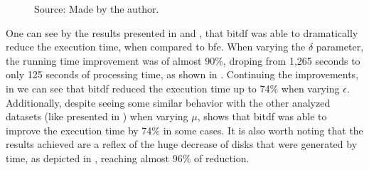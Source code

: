 {\begin{figure}[h!]
\begin{subfigure}[t]{0.48\textwidth}
        \label{fig:tdrive_vary_g}
    \end{subfigure}
    \footnotesize{Source: Made by the author.}
    \label{fig:tdrive_results}
\end{figure}

One can see by the results presented in  and , that \ac{bitdf}
was able to dramatically reduce the execution time, when compared to \ac{bfe}. When varying the $\delta$ parameter, the
running time improvement was of almost 90\%, droping from 1,265 seconds to only 125 seconds of processing time, as shown
in . Continuing the improvements, in  we can see that \ac{bitdf}
reduced the execution time up to 74\% when varying $\epsilon$. Additionally, despite seeing some similar behavior with
the other analyzed datasets (like presented in ) when varying $\mu$,  shows
that \ac{bitdf} was able to improve the execution time by 74\% in some cases. It is also worth noting that the results
achieved are a reflex of the huge decrease of disks that were generated by time, as depicted in
, reaching almost 96\% of reduction.

}
